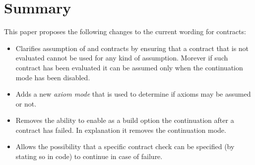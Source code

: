\section{Summary}

This paper proposes the following changes to the current wording for contracts:

\begin{itemize}

\item Clarifies assumption of  and  contracts by
ensuring that a contract that is not evaluated cannot be used for any kind of
assumption. Morever if such contract has been evaluated it can be assumed only
when the continuation mode has been disabled.

\item Adds a new \emph{axiom mode} that is used to determine if axioms may be
assumed or not.

\item Removes the ability to enable as a build option the continuation after a 
	contract has failed. In explanation it removes the continuation mode.

\item Allows the possibility that a specific contract check can be specified
	(by stating so in code) to continue in case of failure.

\end{itemize}

